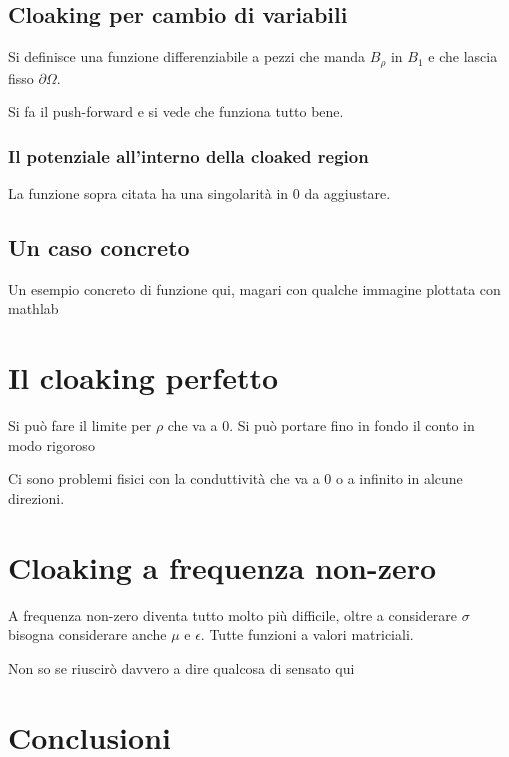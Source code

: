 \documentclass{book}
\begin{document}
\section{Cloaking per cambio di variabili}
Si definisce una funzione differenziabile a pezzi che manda $B_\rho$ in $B_1$ e che lascia fisso $\partial\Omega$.

Si fa il push-forward e si vede che funziona tutto bene.

\subsection{Il potenziale all'interno della cloaked region}
La funzione sopra citata ha una singolarità in 0 da aggiustare.

\section{Un caso concreto}
Un esempio concreto di funzione qui, magari con qualche immagine plottata con mathlab






\chapter{Il cloaking perfetto}
Si può fare il limite per $\rho$ che va a 0. Si può portare fino in fondo il conto in modo rigoroso

Ci sono problemi fisici con la conduttività che va a 0 o a infinito in alcune direzioni.







\chapter{Cloaking a frequenza non-zero}
A frequenza non-zero diventa tutto molto più difficile, oltre a considerare $\sigma$ bisogna considerare anche $\mu$ e $\epsilon$. Tutte funzioni a valori matriciali.

Non so se riuscirò davvero a dire qualcosa di sensato qui




\chapter{Conclusioni}
\end{document}
